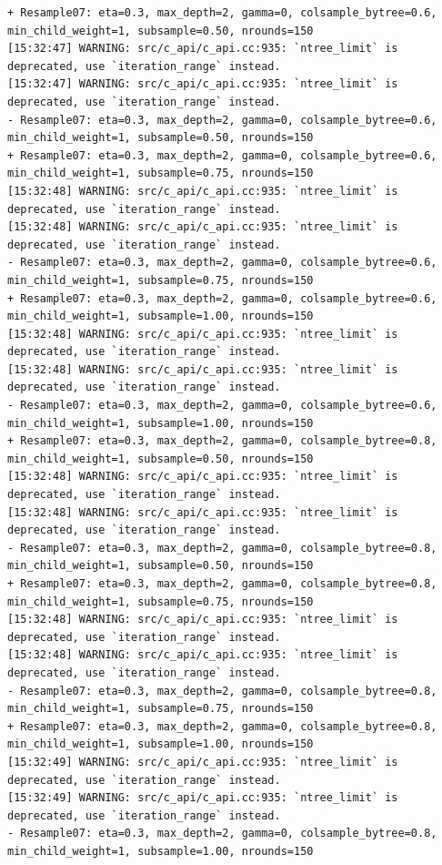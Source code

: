 \documentclass[
  letterpaper,
  DIV=11,
  numbers=noendperiod]{scrartcl}
\begin{document}
\begin{verbatim}
+ Resample07: eta=0.3, max_depth=2, gamma=0, colsample_bytree=0.6, min_child_weight=1, subsample=0.50, nrounds=150 
[15:32:47] WARNING: src/c_api/c_api.cc:935: `ntree_limit` is deprecated, use `iteration_range` instead.
[15:32:47] WARNING: src/c_api/c_api.cc:935: `ntree_limit` is deprecated, use `iteration_range` instead.
- Resample07: eta=0.3, max_depth=2, gamma=0, colsample_bytree=0.6, min_child_weight=1, subsample=0.50, nrounds=150 
+ Resample07: eta=0.3, max_depth=2, gamma=0, colsample_bytree=0.6, min_child_weight=1, subsample=0.75, nrounds=150 
[15:32:48] WARNING: src/c_api/c_api.cc:935: `ntree_limit` is deprecated, use `iteration_range` instead.
[15:32:48] WARNING: src/c_api/c_api.cc:935: `ntree_limit` is deprecated, use `iteration_range` instead.
- Resample07: eta=0.3, max_depth=2, gamma=0, colsample_bytree=0.6, min_child_weight=1, subsample=0.75, nrounds=150 
+ Resample07: eta=0.3, max_depth=2, gamma=0, colsample_bytree=0.6, min_child_weight=1, subsample=1.00, nrounds=150 
[15:32:48] WARNING: src/c_api/c_api.cc:935: `ntree_limit` is deprecated, use `iteration_range` instead.
[15:32:48] WARNING: src/c_api/c_api.cc:935: `ntree_limit` is deprecated, use `iteration_range` instead.
- Resample07: eta=0.3, max_depth=2, gamma=0, colsample_bytree=0.6, min_child_weight=1, subsample=1.00, nrounds=150 
+ Resample07: eta=0.3, max_depth=2, gamma=0, colsample_bytree=0.8, min_child_weight=1, subsample=0.50, nrounds=150 
[15:32:48] WARNING: src/c_api/c_api.cc:935: `ntree_limit` is deprecated, use `iteration_range` instead.
[15:32:48] WARNING: src/c_api/c_api.cc:935: `ntree_limit` is deprecated, use `iteration_range` instead.
- Resample07: eta=0.3, max_depth=2, gamma=0, colsample_bytree=0.8, min_child_weight=1, subsample=0.50, nrounds=150 
+ Resample07: eta=0.3, max_depth=2, gamma=0, colsample_bytree=0.8, min_child_weight=1, subsample=0.75, nrounds=150 
[15:32:48] WARNING: src/c_api/c_api.cc:935: `ntree_limit` is deprecated, use `iteration_range` instead.
[15:32:48] WARNING: src/c_api/c_api.cc:935: `ntree_limit` is deprecated, use `iteration_range` instead.
- Resample07: eta=0.3, max_depth=2, gamma=0, colsample_bytree=0.8, min_child_weight=1, subsample=0.75, nrounds=150 
+ Resample07: eta=0.3, max_depth=2, gamma=0, colsample_bytree=0.8, min_child_weight=1, subsample=1.00, nrounds=150 
[15:32:49] WARNING: src/c_api/c_api.cc:935: `ntree_limit` is deprecated, use `iteration_range` instead.
[15:32:49] WARNING: src/c_api/c_api.cc:935: `ntree_limit` is deprecated, use `iteration_range` instead.
- Resample07: eta=0.3, max_depth=2, gamma=0, colsample_bytree=0.8, min_child_weight=1, subsample=1.00, nrounds=150 

\end{verbatim}
\end{document}
